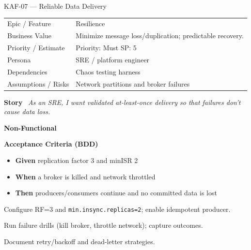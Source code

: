 \documentclass[11pt,a4paper]{article}
\newcommand{\Field}[2]{\textbf{#1}~#2}
\begin{document}
\begin{StoryCardBox}{KAF-07 --- Reliable Data Delivery}
\begin{tabularx}{\linewidth}{LY}
 Epic / Feature & Resilience \\
 Business Value & Minimize message loss/duplication; predictable recovery. \\
 Priority / Estimate & Priority: Must \quad SP: 5 \\
 Persona & SRE / platform engineer \\
 Dependencies & Chaos testing harness \\
 Assumptions / Risks & Network partitions and broker failures \\
\end{tabularx}

\medskip
\Field{Story}{\; \emph{As an SRE, I want validated at-least-once delivery so that failures don't cause data loss.}}

\medskip
\Field{Non-Functional}{\; \; }

\medskip
\Field{Acceptance Criteria (BDD)}{}
\begin{itemize}[leftmargin=1.2em, itemsep=1pt]
  \item \textbf{Given} replication factor 3 and minISR 2
  \item \textbf{When} a broker is killed and network throttled
  \item \textbf{Then} producers/consumers continue and no committed data is lost
\end{itemize}

\begin{TasksBox}
\begin{tasklist}
  \item Configure RF=3 and \texttt{min.insync.replicas=2}; enable idempotent producer.
  \item Run failure drills (kill broker, throttle network); capture outcomes.
  \item Document retry/backoff and dead-letter strategies.
\end{tasklist}
\end{TasksBox}
\end{StoryCardBox}
\clearpage
\end{document}
